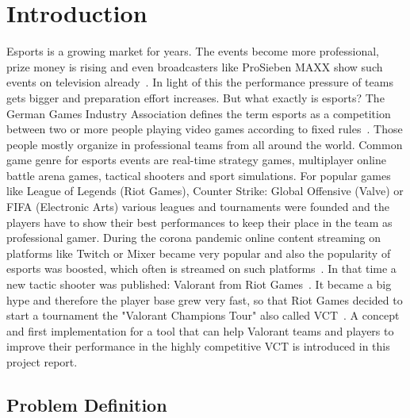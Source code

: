 \chapter{Introduction}\label{chpt:introduction}
\glsresetall

Esports is a growing market for years. The events become more professional, prize money is rising 
and even broadcasters like ProSieben MAXX show such events on television 
already~\cite{kovacevic}. In light of this the performance pressure of teams gets bigger and 
preparation effort increases. But what exactly is esports? The German Games Industry Association 
defines the term esports as a competition between two or more people playing video games 
according to fixed rules~\cite{kovacevic}. Those people mostly organize in professional teams from 
all around the world. Common game genre for esports events are real-time strategy games, 
multiplayer online battle arena games, tactical shooters and sport simulations. For popular games 
like League of Legends (Riot Games), Counter Strike: Global Offensive (Valve) or FIFA (Electronic 
Arts)  various leagues and tournaments were founded and the players have to show their best 
performances to keep their place in the team as professional gamer. During the corona pandemic 
online content streaming on platforms like Twitch or Mixer became very popular and also the 
popularity of esports was boosted, which often is streamed on such platforms~\cite{kovacevic}. In 
that time a new tactic shooter was published: Valorant from Riot Games~\cite{riotgames-valorant}. It 
became a big hype and therefore the player base grew very fast, so that Riot Games decided to start 
a tournament the "Valorant Champions Tour" also called VCT~\cite{riotgames-vct}. A concept and 
first implementation for a tool that can help Valorant teams and players to improve their performance 
in the highly competitive VCT is introduced in this project report.

\section{Problem Definition}\label{sec:intro:problem}


